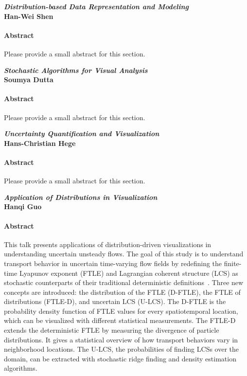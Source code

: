 \documentclass[preprint,journal]{vgtc}       %
\newcommand{\addverticalspace}{\vspace{3mm}}
\begin{document}
\noindent\textbf{\textit{Distribution-based Data Representation and Modeling}}\\
\textbf{Han-Wei Shen}
\paragraph{Abstract}
Please provide a small abstract for this section.

\addverticalspace

\noindent\textbf{\textit{Stochastic Algorithms for Visual Analysis}}\\
\textbf{Soumya Dutta}
\paragraph{Abstract}
Please provide a small abstract for this section.

\addverticalspace

\noindent\textbf{\textit{Uncertainty Quantification and Visualization}}\\
\textbf{Hans-Christian Hege}
\paragraph{Abstract}
Please provide a small abstract for this section.

\addverticalspace

\noindent\textbf{\textit{Application of Distributions in Visualization}}\\
\textbf{Hanqi Guo}
\paragraph{Abstract}

This talk presents applications of distribution-driven visualizations in understanding uncertain unsteady flows.  The goal of this study is to understand transport behavior in uncertain time-varying flow fields by redefining the
finite-time Lyapunov exponent (FTLE) and Lagrangian coherent structure (LCS) as stochastic counterparts of their traditional deterministic definitions~\cite{Guo16}. Three new concepts are introduced: the distribution of the FTLE (D-FTLE), the FTLE of distributions (FTLE-D), and uncertain LCS (U-LCS). The D-FTLE is the probability density function of FTLE values for every spatiotemporal location, which can be visualized with different statistical measurements. The FTLE-D extends the deterministic FTLE by measuring the divergence of particle distributions. It gives a statistical overview of how transport behaviors vary in neighborhood locations. The U-LCS, the probabilities of finding LCSs over the domain, can be extracted with stochastic ridge finding and density estimation
algorithms.  
\end{document}
